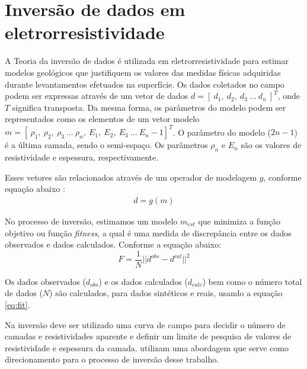 \section{Inversão de dados em eletrorresistividade}
\label{subsec:inversao_de_dados_em_er}

A Teoria da inversão de dados é utilizada em eletrorresistividade para estimar modelos geológicos que justifiquem os valores das medidas físicas adquiridas durante levantamentos efetuados na superfície. Os dados coletados no campo podem ser expressas através de um vetor de dados $d = {[~d_1,~d_2,~d_3~...~d_n~]}^{T}$, onde $T$ significa transposta. Da mesma forma, os parâmetros do modelo podem ser representados como os elementos de um vetor modelo $m = [~\rho_1,~\rho_2,~\rho_3~...~\rho_n,~E_1,~E_2,~E_3~...~E_n-1]^{T}$. O parâmetro do modelo ($2n - 1$) é a última camada, sendo o semi-espaço. Os parâmetros $\rho_n$ e $E_n$ são os valores de resistividade e espessura, respectivamente.

Esses vetores são relacionados através de um operador de modelagem $g$, conforme equação abaixo \cite{koefoed1979resistivity}:
\begin{align}
    \label{eq:dgm}
    d=g(m)
\end{align}

No processo de inversão, estimamos um modelo $m_{est}$ que minimiza a função objetivo ou função \textit{fitness}, a qual é uma medida de discrepância entre os dados observados e dados calculados. Conforme a equação abaixo:
\begin{equation}
    \label{eq:fit}
    F=\frac{1}{N}|| d^{obs}-d^{cal}||^2
\end{equation}


Os dados observados ($d_{obs}$) e os dados calculados ($d_{calc}$) bem como o número total de dados ($N$) são calculados, para dados sintéticos e reais, usando a equação \ref{eq:fit}. \cite{Benjumea_1d_2021}

Na inversão deve ser utilizado uma curva de campo para decidir o número de camadas e resistividades aparente e definir um limite de pesquisa de valores de resistividade e espessura da camada.  utilizam uma abordagem que serve como direcionamento para o processo de inversão desse trabalho.